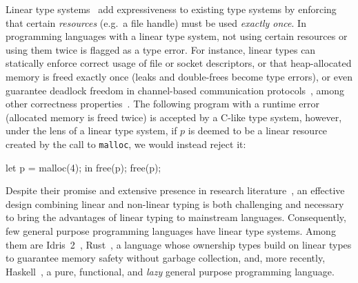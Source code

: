 \documentclass[acmsmall,review,anonymous]{acmart}
\begin{document}
Linear type systems~\cite{cite:linear-logic,cite:barberdill} add expressiveness
to existing type systems by enforcing that certain \emph{resources} (e.g.~a
file handle) must be used \emph{exactly once}.
%
In programming languages with a linear type system, not using certain resources
or using them twice is flagged as a type error. For instance, linear types can
statically enforce correct usage of file or socket descriptors, or
that heap-allocated memory is freed exactly once (leaks and double-frees become
type errors), or even guarantee deadlock freedom in channel-based communication
protocols~\cite{10.1007/978-3-642-15375-4_16},
among other correctness properties~\cite{10.1145/3373718.3394765,10.1145/3527313,cite:linearhaskell}.
%
The following program with a runtime error (allocated memory is freed twice) is
accepted by a C-like type system, however, under the lens of a linear type
system, if $p$ is deemed to be a linear resource created by the call to
\texttt{malloc}, we would instead reject it:
\begin{code}
let p = malloc(4); in free(p); free(p);
\end{code}

Despite their promise and extensive presence in research
literature~\cite{Wadler1990LinearTC,CERVESATO2000133,10.1093/logcom/2.3.297},
an effective design combining linear and non-linear typing is both
challenging and necessary to bring the advantages of linear typing to
mainstream languages.
%
Consequently, few general purpose programming languages have linear
type systems. Among them are Idris~2~\cite{brady:LIPIcs.ECOOP.2021.9},
Rust~\cite{10.1145/2692956.2663188}, a language whose
ownership types build on linear types to guarantee memory safety
without garbage collection, and, more recently,
Haskell~\cite{cite:linearhaskell}, a pure, functional, and
\emph{lazy} general purpose programming language.
%
%
\end{document}
